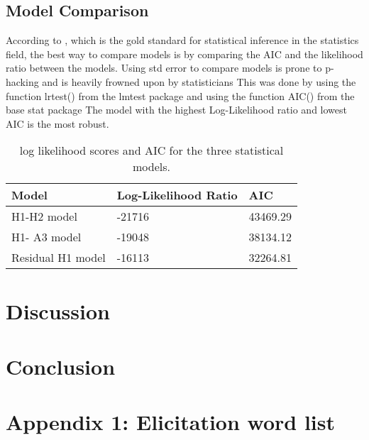 \documentclass[12pt, letterpaper]{article}
\providecommand{\lsptoprule}{\midrule\toprule}
\providecommand{\lspbottomrule}{\bottomrule\midrule}
\begin{document}
\subsection{Model Comparison} \label{sec:Comparison}


According to \citet{casellaStatisticalInference2002}, which is the gold standard for statistical inference in the statistics field, the best way to compare models is by comparing the AIC and the likelihood ratio between the models.
Using std error to compare models is prone to p-hacking and is heavily frowned upon by statisticians 
This was done by using the function lrtest() from the lmtest package and using the function AIC() from the base stat package
The model with the highest Log-Likelihood ratio and lowest AIC is the most robust. 

\begin{table}[!h]
  \centering
  \caption{log likelihood scores and AIC for the three statistical models.}
  \label{tab:Comparison}
  \begin{tabular}{lll}
    \lsptoprule
    Model & Log-Likelihood Ratio & AIC \\
    \hline
    H1-H2 model & -21716 & 43469.29 \\
    H1- A3 model & -19048 & 38134.12 \\
    Residual H1 model & -16113 & 32264.81 \\
    \lspbottomrule
  \end{tabular}
\end{table}

\section{Discussion} \label{sec:Discussion}



\section{Conclusion} \label{sec:Conclusions}



\printbibliography[heading=bibintoc]

\section*{Appendix 1: Elicitation word list}
\end{document}

